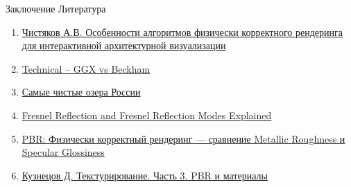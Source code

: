 \documentclass{beamer}
\begin{document}
	\begin{frame}{Заключение}
		Литература
		\begin{enumerate}
			\item \href{https://dspace.susu.ru/xmlui/bitstream/handle/0001.74/30326/73_77.pdf?sequence=1&isAllowed=y}{Чистяков А.В. Особенности алгоритмов физически корректного рендеринга для интерактивной архитектурной визуализации}
			\item \href{https://tryingtobeananimator.wordpress.com/2018/11/25/technical-ggx-vs-beckham-why-and-whats-the-difference/}{Technical – GGX vs Beckham}
			\item \href{https://vivareit.ru/samye-chistye-ozera-rossii-kristalnaya-semerka/}{Самые чистые озера России}
			\item \href{https://shanesimmsart.wordpress.com/2022/03/29/fresnel-reflection/}{Fresnel Reflection and Fresnel Reflection Modes Explained}
			\item \href{https://www.youtube.com/watch?v=yQig4ax1S8A}{PBR: Физически корректный рендеринг — сравнение Metallic Roughness и Specular Glossiness}
			\item \href{https://habr.com/ru/articles/458696/}{Кузнецов Д. Текстурирование. Часть 3. PBR и материалы}
		\end{enumerate}

	\end{frame}
	
\end{document}
